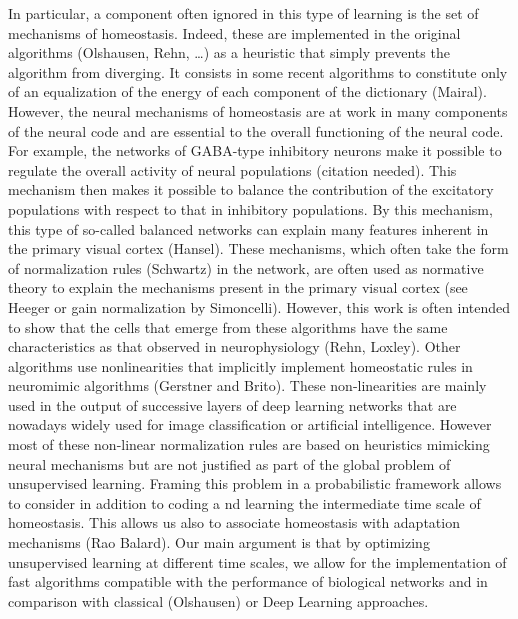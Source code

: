 \documentclass[a4paper, 11pt, draft]{article} %
\begin{document}
In particular, a component often ignored in this type of learning is the set of mechanisms of homeostasis. Indeed, these are implemented in the original algorithms (Olshausen, Rehn, \ldots{}) as a heuristic that simply prevents the algorithm from diverging. It consists in some recent algorithms to constitute only of an equalization of the energy of each component of the dictionary (Mairal). However, the neural mechanisms of homeostasis are at work in many components of the neural code and are essential to the overall functioning of the neural code. For example, the networks of GABA-type inhibitory neurons make it possible to regulate the overall activity of neural populations (citation needed). This mechanism then makes it possible to balance the contribution of the excitatory populations with respect to that in inhibitory populations. By this mechanism, this type of so-called balanced networks can explain many features inherent in the primary visual cortex (Hansel). These mechanisms, which often take the form of normalization rules (Schwartz) in the network, are often used as normative theory to explain the mechanisms present in the primary visual cortex (see Heeger or gain normalization by Simoncelli). However, this work is often intended to show that the cells that emerge from these algorithms have the same characteristics as that observed in neurophysiology (Rehn, Loxley). Other algorithms use nonlinearities that implicitly implement homeostatic rules in neuromimic algorithms (Gerstner and Brito). These non-linearities are mainly used in the output of successive layers of deep learning networks that are nowadays widely used for image classification or artificial intelligence. However most of these non-linear normalization rules are based on heuristics mimicking neural mechanisms but are not justified as part of the global problem of unsupervised learning. Framing this problem in a probabilistic framework allows to consider in addition to coding a	nd learning the intermediate time scale of homeostasis. This allows us also to associate homeostasis with adaptation mechanisms (Rao Balard). Our main argument is that by optimizing unsupervised learning at different time scales, we allow for the implementation of fast algorithms compatible with the performance of biological networks and in comparison with classical (Olshausen) or Deep Learning approaches.
\end{document}

